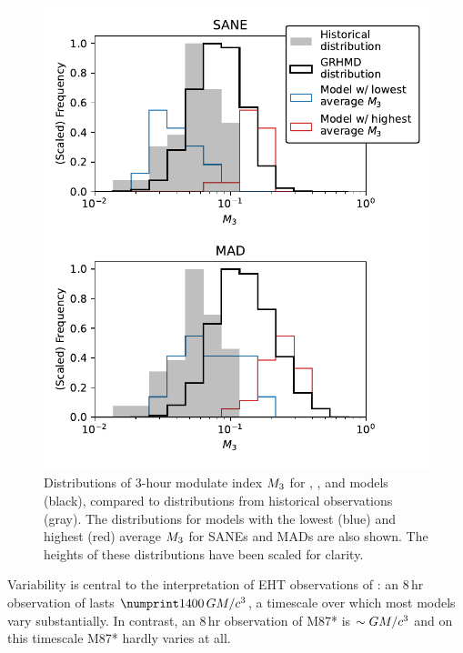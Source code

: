 \begin{figure}
  \centering
  \includegraphics[width=\columnwidth]{./figures/mi_hist.pdf}
  \caption{Distributions of 3-hour modulate index $M_{3}$ for \bhac, \kharma, and \hamr models (black), compared to distributions from historical observations (gray).
The distributions for models with the lowest (blue) and highest (red) average $M_{3}$ for SANEs and MADs are also shown.
The heights of these distributions have been scaled for clarity.}
  \label{fig:cmp_ALMA_var}
\end{figure}

Variability is central to the interpretation of EHT observations of \sgra: an $8\,\mathrm{hr}$ observation of \sgra lasts $\no{1400}\,\tg$, a timescale over which most models vary substantially.
In contrast, an $8\,\mathrm{hr}$ observation of M87* is $\sim GM/c^3$ and on this timescale M87* hardly varies at all.


